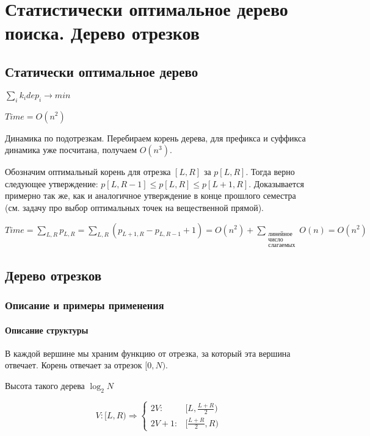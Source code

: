 \chapter{Статистически оптимальное дерево поиска. Дерево отрезков}

\section{Статически оптимальное дерево}

$\sum \limits_i k_i dep_i \rightarrow min$

$Time = O(n^2)$

Динамика по подотрезкам.
Перебираем корень дерева, для префикса и суффикса динамика уже посчитана, получаем $O(n^3)$.

Обозначим оптимальный корень для отрезка $[L, R]$ за $p[L, R]$.
Тогда верно следующее утверждение: $p[L, R - 1] \le p[L, R] \le p[L + 1, R]$.
Доказывается примерно так же, как и аналогичное утверждение в конце прошлого семестра (см. задачу про выбор оптимальных точек на вещественной прямой).

$Time = \sum \limits_{L, R} p_{L,R} = \sum \limits_{L, R} (p_{L + 1, R} - p_{L, R - 1} + 1) = O(n^2) + \sum \limits_{\substack{\text{линейное}\\
\text{число}\\
\text{слагаемых}}}
O(n) = O(n^2)$

\section{Дерево отрезков}

\subsection{Описание и примеры применения}

\subsubsection{Описание структуры}


В каждой вершине мы храним функцию от отрезка, за который эта вершина отвечает.
Корень отвечает за отрезок $[0, N)$.

Высота такого дерева $\log_2 N$

\begin{equation*}
	V: [L, R) \Rightarrow
	\begin{cases}
		2V: & [L, \frac{L+R}{2}) \\
		2V+1: & [\frac{L+R}{2}, R)
	\end{cases}
\end{equation*}

